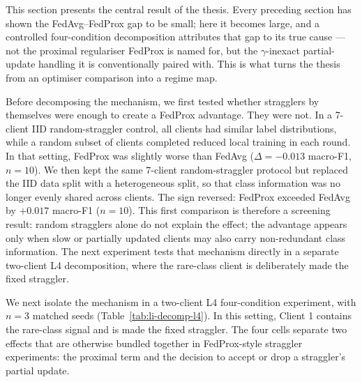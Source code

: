\documentclass[11pt,a4paper]{report}
\begin{document}
This section presents the central result of the thesis. Every preceding
section has shown the FedAvg--FedProx gap to be small; here it becomes
large, and a controlled four-condition decomposition attributes that gap
to its true cause --- not the proximal regulariser FedProx is named for,
but the $\gamma$-inexact partial-update handling it is conventionally
paired with. This is what turns the thesis from an optimiser comparison
into a regime map.

Before decomposing the mechanism, we first tested whether stragglers by
themselves were enough to create a FedProx advantage. They were not. In a
7-client IID random-straggler control, all clients had similar label
distributions, while a random subset of clients completed reduced local
training in each round. In that setting, FedProx was slightly worse than
FedAvg ($\Delta = -0.013$ macro-F1, $n = 10$). We then kept the same
7-client random-straggler protocol but replaced the IID data split with a
heterogeneous split, so that class information was no longer evenly shared
across clients. The sign reversed: FedProx exceeded FedAvg by $+0.017$
macro-F1 ($n = 10$). This first comparison is therefore a screening
result: random stragglers alone do not explain the effect; the advantage
appears only when slow or partially updated clients may also carry
non-redundant class information. The next experiment tests that mechanism
directly in a separate two-client L4 decomposition, where the rare-class
client is deliberately made the fixed straggler.

We next isolate the mechanism in a two-client L4 four-condition experiment,
with $n=3$ matched seeds (Table~\ref{tab:li-decomp-l4}). In this setting,
Client 1 contains the rare-class signal and is made the fixed straggler. The
four cells separate two effects that are otherwise bundled together in
FedProx-style straggler experiments: the proximal term and the decision to
accept or drop a straggler's partial update.
\end{document}
